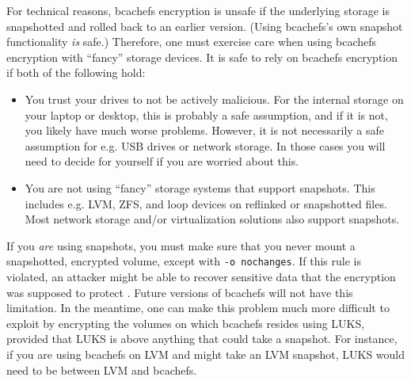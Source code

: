 \documentclass{article}
\begin{document}
For technical reasons, bcachefs encryption is unsafe if the underlying storage
is snapshotted and rolled back to an earlier version.  (Using bcachefs's own
snapshot functionality \textit{is} safe.) Therefore, one must exercise care
when using bcachefs encryption with ``fancy'' storage devices.  It is safe to
rely on bcachefs encryption if both of the following hold:

\begin{itemize}
	\item You trust your drives to not be actively malicious. For the
	      internal storage on your laptop or desktop, this is probably a
	      safe assumption, and if it is not, you likely have much worse
	      problems. However, it is not necessarily a safe assumption for
	      e.g. USB drives or network storage. In those cases you will
	      need to decide for yourself if you are worried about this.

	\item You are not using ``fancy'' storage systems that support snapshots.
	      This includes e.g. LVM, ZFS, and loop devices on reflinked or
	      snapshotted files. Most network storage and/or virtualization
	      solutions also support snapshots.
\end{itemize}

If you \textit{are} using snapshots, you must make sure that you never mount
a snapshotted, encrypted volume, except with \texttt{-o nochanges}.  If this
rule is violated, an attacker might be able to recover sensitive data that
the encryption was supposed to protect \footnotemark.  Future versions of
bcachefs will not have this limitation.  In the meantime, one can make this
problem much more difficult to exploit by encrypting the volumes on which
bcachefs resides using LUKS, provided that LUKS is above anything that could
take a snapshot.  For instance, if you are using bcachefs on LVM and might
take an LVM snapshot, LUKS would need to be between LVM and bcachefs.

\end{document}

